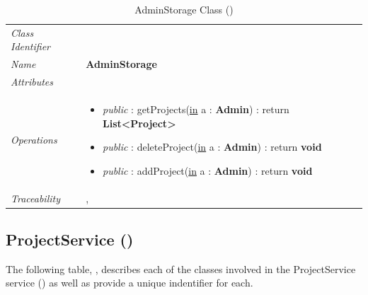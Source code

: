 \documentclass[12pt,letterpaper]{article}
\begin{document}
\begin{table}[H]
    \caption{AdminStorage Class ()} 
	\begin{tabu} to 
		\toprule
		Class Identifier &  \\
		Name & {\bf AdminStorage} \\
		Attributes & \\

		Operations &
		\begin{minipage}[t]{\linewidth}
			\begin{itemize}
			    \item {\it public} : getProjects(\underline{in} a : {\bf Admin}) : return {\bf List<Project>}
			    \item {\it public} : deleteProject(\underline{in} a : {\bf Admin}) : return {\bf void}
			    \item {\it public} : addProject(\underline{in} a : {\bf Admin}) : return {\bf void}
	        \end{itemize}
	    \end{minipage} \\
	    	Traceability & , \\
		\toprule
	\end{tabu}
\end{table}

\subsection{ProjectService ()}

The following table, , describes each of the classes involved in the ProjectService service () as well as provide a unique indentifier for each.
\end{document}
